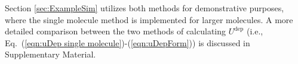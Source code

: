 \documentclass[5p,times]{elsarticle}
\begin{document}
Section \ref{sec:ExampleSim} utilizes both methods for demonstrative purposes, where the single molecule method is implemented for larger molecules. A more detailed comparison between the two methods of calculating $U^{\mathrm{dep}}$ (i.e., Eq.~(\ref{eqn:uDep single molecule})-(\ref{eqn:uDepForm})) is discussed in Supplementary Material.




\end{document}
